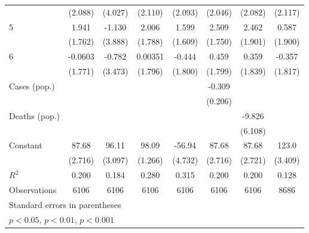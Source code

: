 \documentclass{article}
\begin{document}
{\begin{longtable}{l*{7}{c}}
                &  (2.088)         &  (4.027)         &  (2.110)         &  (2.093)         &  (2.046)         &  (2.082)         &  (2.117)         \\
5               &    1.941         &   -1.130         &    2.006         &    1.599         &    2.509         &    2.462         &    0.587         \\
                &  (1.762)         &  (3.888)         &  (1.788)         &  (1.609)         &  (1.750)         &  (1.901)         &  (1.900)         \\
6               &  -0.0603         &   -0.782         &  0.00351         &   -0.444         &    0.459         &    0.359         &   -0.357         \\
                &  (1.771)         &  (3.473)         &  (1.796)         &  (1.800)         &  (1.799)         &  (1.839)         &  (1.817)         \\
Cases (pop.)    &                  &                  &                  &                  &   -0.309         &                  &                  \\
                &                  &                  &                  &                  &  (0.206)         &                  &                  \\
Deaths (pop.)   &                  &                  &                  &                  &                  &   -9.826         &                  \\
                &                  &                  &                  &                  &                  &  (6.108)         &                  \\
Constant        &    87.68\sym{***}&    96.11\sym{***}&    98.09\sym{***}&   -56.94\sym{***}&    87.68\sym{***}&    87.68\sym{***}&    123.0\sym{***}\\
                &  (2.716)         &  (3.097)         &  (1.266)         &  (4.732)         &  (2.716)         &  (2.721)         &  (3.409)         \\
\hline
\(R^{2}\)       &    0.200         &    0.184         &    0.280         &    0.315         &    0.200         &    0.200         &    0.128         \\
Observations    &     6106         &     6106         &     6106         &     6106         &     6106         &     6106         &     8686         \\
\hline\hline
\multicolumn{8}{l}{\footnotesize Standard errors in parentheses}\\
\multicolumn{8}{l}{\footnotesize \sym{*} \(p<0.05\), \sym{**} \(p<0.01\), \sym{***} \(p<0.001\)}\\
\end{longtable}
}
\end{document}
